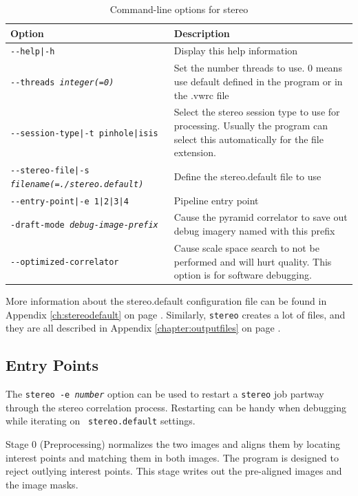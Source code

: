 \begin{longtable}{|l|p{7.5cm}|}
\caption{Command-line options for stereo}
\label{tbl:stereo}
\endfirsthead
\endhead
\endfoot
\endlastfoot
\hline
Option & Description \\ \hline \hline
\texttt{-\/-help|-h} & Display this help information\\ \hline
\texttt{-\/-threads \textit{integer(=0)}} & Set the number threads to use. 0 means use default defined in the program or in the .vwrc file\\ \hline
\texttt{-\/-session-type|-t pinhole|isis} & Select the stereo session type to use for processing. Usually the program can select this automatically for the file extension.\\ \hline
\texttt{-\/-stereo-file|-s \textit{filename(=./stereo.default)}} & Define the stereo.default file to use\\ \hline
\texttt{-\/-entry-point|-e 1|2|3|4} & Pipeline entry point \\ \hline
\texttt{-draft-mode \textit{debug-image-prefix}} & Cause the pyramid correlator to save out debug imagery named with this prefix\\ \hline
\texttt{-\/-optimized-correlator} & Cause scale space search to not be performed and will hurt quality. This option is for software debugging.\\ \hline
\end{longtable}

More information about the stereo.default configuration file can be found in Appendix \ref{ch:stereodefault} on page \pageref{ch:stereodefault}.  Similarly, \texttt{stereo} creates a lot of files, and they are all described in Appendix \ref{chapter:outputfiles} on page \pageref{chapter:outputfiles}.

\subsection{Entry Points}
\label{entrypoints}

The \texttt{stereo -e \textit{number}} option can be used to restart
a {\tt stereo} job partway through the stereo correlation process.
Restarting can be handy when debugging while iterating on {\tt
stereo.default} settings.

Stage 0 (Preprocessing) normalizes the two images and aligns them
by locating interest points and matching them in both images. The
program is designed to reject outlying interest points.  This stage
writes out the pre-aligned images and the image masks.

